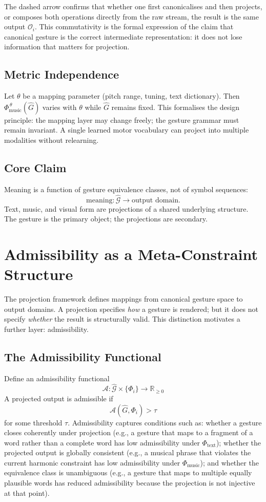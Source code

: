 \documentclass[11pt, a4paper]{article}
\begin{document}
The dashed arrow confirms that whether one first canonicalises and then
projects, or composes both operations directly from the raw stream, the
result is the same output $\mathcal{O}_i$. This commutativity is the
formal expression of the claim that canonical gesture is the correct
intermediate representation: it does not lose information that matters
for projection.

\subsection{Metric Independence}

Let $\theta$ be a mapping parameter (pitch range, tuning, text
dictionary). Then $\Phi_{\mathrm{music}}^{\,\theta}(\hat{G})$ varies
with $\theta$ while $\hat{G}$ remains fixed. This formalises the design
principle: the mapping layer may change freely; the gesture grammar must
remain invariant. A single learned motor vocabulary can project into
multiple modalities without relearning.

\subsection{Core Claim}

Meaning is a function of gesture equivalence classes, not of symbol
sequences:
\[
  \mathrm{meaning} : \hat{\mathcal{G}} \to \text{output domain}.
\]
Text, music, and visual form are projections of a shared underlying
structure. The gesture is the primary object; the projections are
secondary.

\section{Admissibility as a Meta-Constraint Structure}

The projection framework defines mappings from canonical gesture space to
output domains. A projection specifies \emph{how} a gesture is rendered;
but it does not specify \emph{whether} the result is structurally valid.
This distinction motivates a further layer: admissibility.

\subsection{The Admissibility Functional}

Define an admissibility functional
\[
  \mathcal{A} : \hat{\mathcal{G}} \times \{\Phi_i\} \to \mathbb{R}_{\ge 0}
\]
A projected output is admissible if
\[
  \mathcal{A}(\hat{G}, \Phi_i) > \tau
\]
for some threshold $\tau$. Admissibility captures conditions such as:
whether a gesture closes coherently under projection (e.g., a gesture
that maps to a fragment of a word rather than a complete word has low
admissibility under $\Phi_{\mathrm{text}}$); whether the projected
output is globally consistent (e.g., a musical phrase that violates the
current harmonic constraint has low admissibility under
$\Phi_{\mathrm{music}}$); and whether the equivalence class is
unambiguous (e.g., a gesture that maps to multiple equally plausible
words has reduced admissibility because the projection is not injective
at that point).
\end{document}
